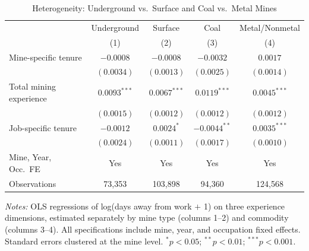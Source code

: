 \begin{table}[t]
\centering
\caption{Heterogeneity: Underground vs.~Surface and Coal vs.~Metal Mines}
\label{tab:heterogeneity}
\begin{tabular}{lcccc}
\toprule
 & Underground & Surface & Coal & Metal/Nonmetal \\
 & (1) & (2) & (3) & (4) \\
\midrule
Mine-specific tenure & $-0.0008$ & $-0.0008$ & $-0.0032$ & $0.0017$ \\
 & $(0.0034)$ & $(0.0013)$ & $(0.0025)$ & $(0.0014)$ \\
\addlinespace
Total mining experience & $0.0093^{***}$ & $0.0067^{***}$ & $0.0119^{***}$ & $0.0045^{***}$ \\
 & $(0.0015)$ & $(0.0012)$ & $(0.0012)$ & $(0.0012)$ \\
\addlinespace
Job-specific tenure & $-0.0012$ & $0.0024^{*}$ & $-0.0044^{**}$ & $0.0035^{***}$ \\
 & $(0.0024)$ & $(0.0011)$ & $(0.0017)$ & $(0.0010)$ \\
\midrule
Mine, Year, Occ.~FE & Yes & Yes & Yes & Yes \\
Observations & 73,353 & 103,898 & 94,360 & 124,568 \\
\bottomrule
\end{tabular}
\begin{tablenotes}[flushleft]
\item \textit{Notes:} OLS regressions of log(days away from work $+$ 1) on three experience dimensions, estimated separately by mine type (columns 1--2) and commodity (columns 3--4). All specifications include mine, year, and occupation fixed effects. Standard errors clustered at the mine level. $^{*}p<0.05$; $^{**}p<0.01$; $^{***}p<0.001$.
\end{tablenotes}
\end{table}

